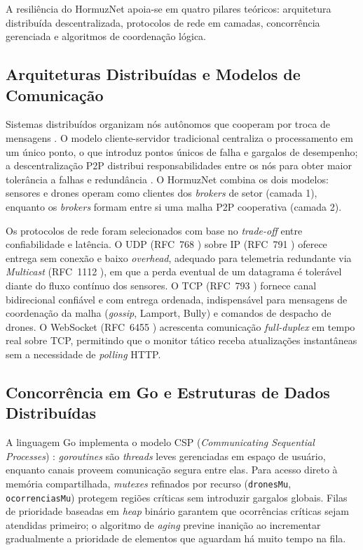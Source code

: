 A resiliência do HormuzNet apoia-se em quatro pilares teóricos: arquitetura distribuída descentralizada, protocolos de rede em camadas, concorrência gerenciada e algoritmos de coordenação lógica.

\subsection{Arquiteturas Distribuídas e Modelos de Comunicação}

Sistemas distribuídos organizam nós autônomos que cooperam por troca de mensagens \cite{tanenbaum2021redes}. O modelo cliente-servidor tradicional centraliza o processamento em um único ponto, o que introduz pontos únicos de falha e gargalos de desempenho; a descentralização P2P distribui responsabilidades entre os nós para obter maior tolerância a falhas e redundância \cite{tanenbaum2021redes}. O HormuzNet combina os dois modelos: sensores e drones operam como clientes dos \textit{brokers} de setor (camada 1), enquanto os \textit{brokers} formam entre si uma malha P2P cooperativa (camada 2).

Os protocolos de rede foram selecionados com base no \textit{trade-off} entre confiabilidade e latência. O UDP (RFC~768 \cite{rfc768}) sobre IP (RFC~791 \cite{rfc791}) oferece entrega sem conexão e baixo \textit{overhead}, adequado para telemetria redundante via \textit{Multicast} (RFC~1112 \cite{rfc1112}), em que a perda eventual de um datagrama é tolerável diante do fluxo contínuo dos sensores. O TCP (RFC~793 \cite{rfc793}) fornece canal bidirecional confiável e com entrega ordenada, indispensável para mensagens de coordenação da malha (\textit{gossip}, Lamport, Bully) e comandos de despacho de drones. O WebSocket (RFC~6455 \cite{rfc6455}) acrescenta comunicação \textit{full-duplex} em tempo real sobre TCP, permitindo que o monitor tático receba atualizações instantâneas sem a necessidade de \textit{polling} HTTP.

\subsection{Concorrência em Go e Estruturas de Dados Distribuídas}

A linguagem Go implementa o modelo CSP (\textit{Communicating Sequential Processes}) \cite{donovan2015go}: \textit{goroutines} são \textit{threads} leves gerenciadas em espaço de usuário, enquanto canais proveem comunicação segura entre elas. Para acesso direto à memória compartilhada, \textit{mutexes} refinados por recurso (\texttt{dronesMu}, \texttt{ocorrenciasMu}) protegem regiões críticas sem introduzir gargalos globais. Filas de prioridade baseadas em \textit{heap} binário garantem que ocorrências críticas sejam atendidas primeiro; o algoritmo de \textit{aging} previne inanição ao incrementar gradualmente a prioridade de elementos que aguardam há muito tempo na fila.

